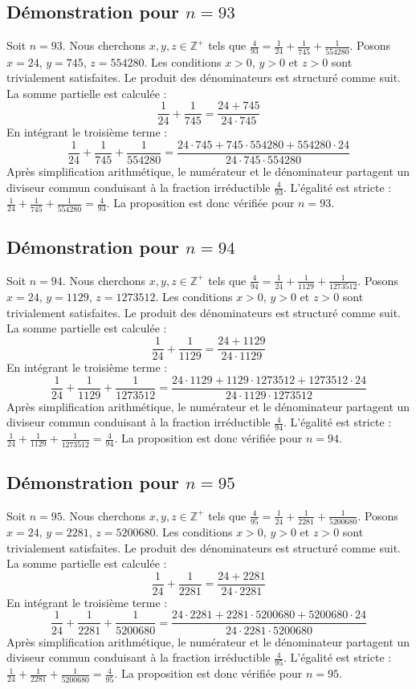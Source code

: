 \documentclass[11pt,a4paper]{article}
\begin{document}
\subsection{Démonstration pour $n = 93$}
Soit $n = 93$. Nous cherchons $x, y, z \in \mathbb{Z}^{+}$ tels que $\frac{4}{93} = \frac{1}{24} + \frac{1}{745} + \frac{1}{554280}$.
Posons $x = 24$, $y = 745$, $z = 554280$.
Les conditions $x > 0$, $y > 0$ et $z > 0$ sont trivialement satisfaites.
Le produit des dénominateurs est structuré comme suit. La somme partielle est calculée :
$$ \frac{1}{24} + \frac{1}{745} = \frac{24+745}{24 \cdot 745} $$
En intégrant le troisième terme :
$$ \frac{1}{24} + \frac{1}{745} + \frac{1}{554280} = \frac{24 \cdot 745 + 745 \cdot 554280 + 554280 \cdot 24}{24 \cdot 745 \cdot 554280} $$
Après simplification arithmétique, le numérateur et le dénominateur partagent un diviseur commun conduisant à la fraction irréductible $\frac{4}{93}$.
L'égalité est stricte : $\frac{1}{24} + \frac{1}{745} + \frac{1}{554280} = \frac{4}{93}$.
La proposition est donc vérifiée pour $n = 93$.
\subsection{Démonstration pour $n = 94$}
Soit $n = 94$. Nous cherchons $x, y, z \in \mathbb{Z}^{+}$ tels que $\frac{4}{94} = \frac{1}{24} + \frac{1}{1129} + \frac{1}{1273512}$.
Posons $x = 24$, $y = 1129$, $z = 1273512$.
Les conditions $x > 0$, $y > 0$ et $z > 0$ sont trivialement satisfaites.
Le produit des dénominateurs est structuré comme suit. La somme partielle est calculée :
$$ \frac{1}{24} + \frac{1}{1129} = \frac{24+1129}{24 \cdot 1129} $$
En intégrant le troisième terme :
$$ \frac{1}{24} + \frac{1}{1129} + \frac{1}{1273512} = \frac{24 \cdot 1129 + 1129 \cdot 1273512 + 1273512 \cdot 24}{24 \cdot 1129 \cdot 1273512} $$
Après simplification arithmétique, le numérateur et le dénominateur partagent un diviseur commun conduisant à la fraction irréductible $\frac{4}{94}$.
L'égalité est stricte : $\frac{1}{24} + \frac{1}{1129} + \frac{1}{1273512} = \frac{4}{94}$.
La proposition est donc vérifiée pour $n = 94$.
\subsection{Démonstration pour $n = 95$}
Soit $n = 95$. Nous cherchons $x, y, z \in \mathbb{Z}^{+}$ tels que $\frac{4}{95} = \frac{1}{24} + \frac{1}{2281} + \frac{1}{5200680}$.
Posons $x = 24$, $y = 2281$, $z = 5200680$.
Les conditions $x > 0$, $y > 0$ et $z > 0$ sont trivialement satisfaites.
Le produit des dénominateurs est structuré comme suit. La somme partielle est calculée :
$$ \frac{1}{24} + \frac{1}{2281} = \frac{24+2281}{24 \cdot 2281} $$
En intégrant le troisième terme :
$$ \frac{1}{24} + \frac{1}{2281} + \frac{1}{5200680} = \frac{24 \cdot 2281 + 2281 \cdot 5200680 + 5200680 \cdot 24}{24 \cdot 2281 \cdot 5200680} $$
Après simplification arithmétique, le numérateur et le dénominateur partagent un diviseur commun conduisant à la fraction irréductible $\frac{4}{95}$.
L'égalité est stricte : $\frac{1}{24} + \frac{1}{2281} + \frac{1}{5200680} = \frac{4}{95}$.
La proposition est donc vérifiée pour $n = 95$.
\end{document}
